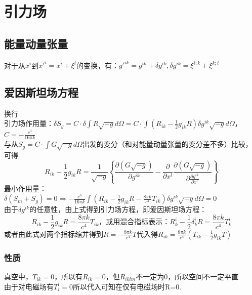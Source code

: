 \documentclass{article}
\newcommand{\huawenxingkai}{\CJKfamily{hwxk}}
\newcommand{\xkuo}[1]{\left(#1\right)}
\newcommand{\dkuo}[1]{\left\lbrace#1\right\rbrace}
\newcommand{\piandao}[2][]{\frac{\partial #1}{\partial #2}}
\begin{document}
	\huawenxingkai\small
	\section{引力场}
	\subsection{能量动量张量}
	对于从$ x^i $到$ x'^i=x^i+\xi^i $的变换，有：$ g'^{ik}=g^{ik}+\delta g^{ik},\delta g^{ik}=\xi^{i;k}+\xi^{k;i} $
	\subsection{爱因斯坦场方程}
	换行\\
	引力场作用量：$ \delta S_g=C\cdot\delta \int R\sqrt{-g}d\Omega=C\cdot\int\xkuo{R_{ik}-\frac{1}{2}g_{ik}R}\delta g^{ik}\sqrt{-g}d\Omega$，$ C=-\frac{c^3}{16 \pi k} $\\
	与从$ S_g=C\cdot\int G\sqrt{-g}d\Omega $出发的变分（和对能量动量张量的变分差不多）比较，可得$$ R_{ik}-\frac{1}{2}g_{ik}R=\frac{1}{\sqrt{-g}}\dkuo{\piandao[\xkuo{G\sqrt{-g}}]{g^{ik}}-\piandao{x^l}\piandao[\xkuo{G\sqrt{-g}}]{\piandao[g^{ik}]{x^l}}} $$
	最小作用量：$\delta \xkuo{S_m+S_g}=0\Rightarrow-\frac{c^3}{16 \pi k}\int\xkuo{R_{ik}-\frac{1}{2}g_{ik}R-\frac{8\pi k}{c^4}T_{ik}}\delta g^{ik}\sqrt{-g}d\Omega=0 $\\
	由于$ \delta g^{ik} $的任意性，由上式得到引力场方程，即爱因斯坦场方程：$$ R_{ik}-\frac{1}{2}g_{ik}R=\frac{8\pi k}{c^4}T_{ik} \text{，或用混合指标表示：}R^i_{k}-\frac{1}{2}\delta^i_kR=\frac{8\pi k}{c^4}T^i_k $$
	或者由此式对两个指标缩并得到$ R=-\frac{8\pi k}{c^4}T $代入得$ R_{ik}=\frac{8\pi k}{c^4}\xkuo{T_{ik}-\frac{1}{2}g_{ik}T} $
	\subsubsection{性质}
	真空中，$ T_{ik}=0 $，所以有$ R_{ik}=0 $，但$ R_{iklm} $不一定为0，所以空间不一定平直\\
	由于对电磁场有$ T^i_i=0 $所以代入可知在仅有电磁场时R=0.
\end{document}
